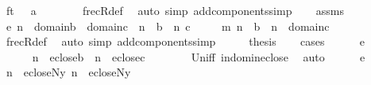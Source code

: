 \begin{isabellebody}
\ {\isachardoublequoteopen}ft\ {\isasymin}\ {}{\isachardoublequoteclose}\ {\isachardoublequoteopen}a\ {\isasymin}\ {}{\isachardoublequoteclose}\isanewline
\ \ \ \ \isamarkupfalse%
\ frecR{\isacharunderscore}{\kern0pt}def\ \isamarkupfalse%
\ {\isacharparenleft}{\kern0pt}auto\ simp\ add{\isacharcolon}{\kern0pt}components{\isacharunderscore}{\kern0pt}simp{\isacharparenright}{\kern0pt}\isanewline
\ \ \isamarkupfalse%
\ assms\isanewline
\ \ \isamarkupfalse%
\ {\isacharparenleft}{\kern0pt}e{\isacharparenright}{\kern0pt}\ {\isachardoublequoteopen}n{}\ {\isasymin}\ domain{\isacharparenleft}{\kern0pt}b{\isacharparenright}{\kern0pt}\ {\isasymunion}\ domain{\isacharparenleft}{\kern0pt}c{\isacharparenright}{\kern0pt}\ {\isasymand}\ {\isacharparenleft}{\kern0pt}n{}\ {\isacharequal}{\kern0pt}\ b\ {\isasymor}\ n{}\ {\isacharequal}{\kern0pt}c{\isacharparenright}{\kern0pt}{\isachardoublequoteclose}\isanewline
\ \ \ \ {\isacharbar}{\kern0pt}\ {\isacharparenleft}{\kern0pt}m{\isacharparenright}{\kern0pt}\ {\isachardoublequoteopen}n{}\ {\isacharequal}{\kern0pt}\ b\ {\isasymand}\ n{}\ {\isasymin}\ domain{\isacharparenleft}{\kern0pt}c{\isacharparenright}{\kern0pt}{\isachardoublequoteclose}\isanewline
\ \ \ \ \isamarkupfalse%
\ frecR{\isacharunderscore}{\kern0pt}def\ \isamarkupfalse%
\ {\isacharparenleft}{\kern0pt}auto\ simp\ add{\isacharcolon}{\kern0pt}components{\isacharunderscore}{\kern0pt}simp{\isacharparenright}{\kern0pt}\isanewline
\ \ \isamarkupfalse%
\ \isamarkupfalse%
\ {\isacharquery}{\kern0pt}thesis\isanewline
\ \ \isamarkupfalse%
\ cases\isanewline
\ \ \ \ \isamarkupfalse%
\ e\isanewline
\ \ \ \ \isamarkupfalse%
\isanewline
\ \ \ \ \isamarkupfalse%
\ {\isachardoublequoteopen}n{}\ {\isasymin}\ eclose{\isacharparenleft}{\kern0pt}b{\isacharparenright}{\kern0pt}\ {\isasymor}\ n{}\ {\isasymin}\ eclose{\isacharparenleft}{\kern0pt}c{\isacharparenright}{\kern0pt}{\isachardoublequoteclose}\isanewline
\ \ \ \ \ \ \isamarkupfalse%
\ Un{\isacharunderscore}{\kern0pt}iff\ in{\isacharunderscore}{\kern0pt}dom{\isacharunderscore}{\kern0pt}in{\isacharunderscore}{\kern0pt}eclose\ \isamarkupfalse%
\ auto\isanewline
\ \ \ \ \isamarkupfalse%
\ e\isanewline
\ \ \ \ \isamarkupfalse%
\ {\isachardoublequoteopen}n{}\ {\isasymin}\ ecloseN{\isacharparenleft}{\kern0pt}{\isacharquery}{\kern0pt}y{\isacharparenright}{\kern0pt}{\isachardoublequoteclose}\ {\isachardoublequoteopen}n{}\ {\isasymin}\ ecloseN{\isacharparenleft}{\kern0pt}{\isacharquery}{\kern0pt}y{\isacharparenright}{\kern0pt}{\isachardoublequoteclose}\isanewline

\end{isabellebody}
